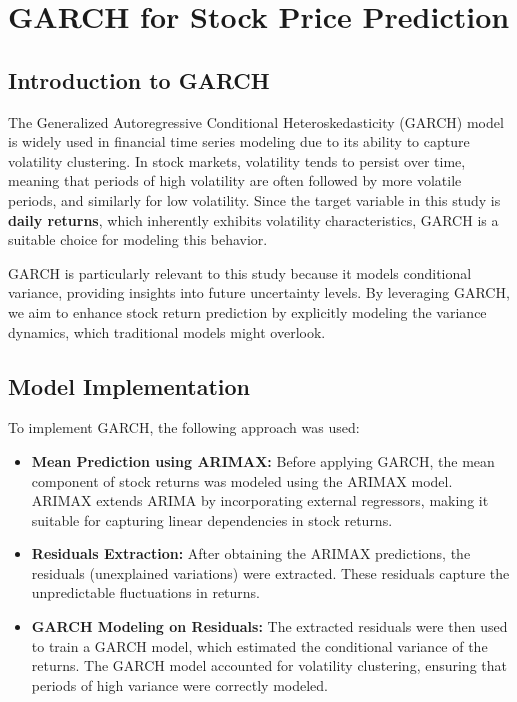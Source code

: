 \section{GARCH for Stock Price Prediction}

\subsection{Introduction to GARCH}

The Generalized Autoregressive Conditional Heteroskedasticity (GARCH) model is widely used in financial time series modeling due to its ability to capture volatility clustering. In stock markets, volatility tends to persist over time, meaning that periods of high volatility are often followed by more volatile periods, and similarly for low volatility. Since the target variable in this study is \textbf{daily returns}, which inherently exhibits volatility characteristics, GARCH is a suitable choice for modeling this behavior.

GARCH is particularly relevant to this study because it models conditional variance, providing insights into future uncertainty levels. By leveraging GARCH, we aim to enhance stock return prediction by explicitly modeling the variance dynamics, which traditional models might overlook.

\subsection{Model Implementation}

To implement GARCH, the following approach was used:

\begin{itemize}
    \item \textbf{Mean Prediction using ARIMAX:} Before applying GARCH, the mean component of stock returns was modeled using the ARIMAX model. ARIMAX extends ARIMA by incorporating external regressors, making it suitable for capturing linear dependencies in stock returns.
    \item \textbf{Residuals Extraction:} After obtaining the ARIMAX predictions, the residuals (unexplained variations) were extracted. These residuals capture the unpredictable fluctuations in returns.
    \item \textbf{GARCH Modeling on Residuals:} The extracted residuals were then used to train a GARCH model, which estimated the conditional variance of the returns. The GARCH model accounted for volatility clustering, ensuring that periods of high variance were correctly modeled.
\end{itemize}


